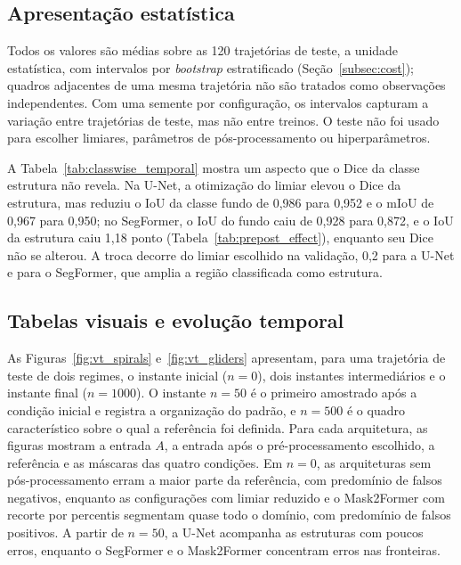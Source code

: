 \documentclass[final,5p,times,twocolumn]{elsarticle}
\begin{document}


\subsection{Apresentação estatística}\label{subsec:statistics}

Todos os valores são médias sobre as 120 trajetórias de teste, a unidade estatística, com intervalos por \textit{bootstrap} estratificado (Seção~\ref{subsec:cost}); quadros adjacentes de uma mesma trajetória não são tratados como observações independentes. Com uma semente por configuração, os intervalos capturam a variação entre trajetórias de teste, mas não entre treinos. O teste não foi usado para escolher limiares, parâmetros de pós-processamento ou hiperparâmetros.

A Tabela~\ref{tab:classwise_temporal} mostra um aspecto que o Dice da classe estrutura não revela. Na U-Net, a otimização do limiar elevou o Dice da estrutura, mas reduziu o IoU da classe fundo de 0,986 para 0,952 e o mIoU de 0,967 para 0,950; no SegFormer, o IoU do fundo caiu de 0,928 para 0,872, e o IoU da estrutura caiu 1,18 ponto (Tabela~\ref{tab:prepost_effect}), enquanto seu Dice não se alterou. A troca decorre do limiar escolhido na validação, 0,2 para a U-Net e para o SegFormer, que amplia a região classificada como estrutura.



\subsection{Tabelas visuais e evolução temporal}\label{subsec:visual}

As Figuras~\ref{fig:vt_spirals} e~\ref{fig:vt_gliders} apresentam, para uma trajetória de teste de dois regimes, o instante inicial ($n=0$), dois instantes intermediários e o instante final ($n=1000$). O instante $n=50$ é o primeiro amostrado após a condição inicial e registra a organização do padrão, e $n=500$ é o quadro característico sobre o qual a referência foi definida. Para cada arquitetura, as figuras mostram a entrada $A$, a entrada após o pré-processamento escolhido, a referência e as máscaras das quatro condições. Em $n=0$, as arquiteturas sem pós-processamento erram a maior parte da referência, com predomínio de falsos negativos, enquanto as configurações com limiar reduzido e o Mask2Former com recorte por percentis segmentam quase todo o domínio, com predomínio de falsos positivos. A partir de $n=50$, a U-Net acompanha as estruturas com poucos erros, enquanto o SegFormer e o Mask2Former concentram erros nas fronteiras.
\end{document}
